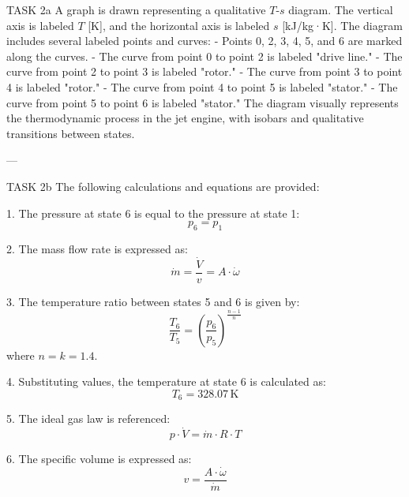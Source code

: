 TASK 2a  
A graph is drawn representing a qualitative \( T \)-\( s \) diagram. The vertical axis is labeled \( T \) [K], and the horizontal axis is labeled \( s \) [kJ/kg·K]. The diagram includes several labeled points and curves:  
- Points 0, 2, 3, 4, 5, and 6 are marked along the curves.  
- The curve from point 0 to point 2 is labeled "drive line."  
- The curve from point 2 to point 3 is labeled "rotor."  
- The curve from point 3 to point 4 is labeled "rotor."  
- The curve from point 4 to point 5 is labeled "stator."  
- The curve from point 5 to point 6 is labeled "stator."  
The diagram visually represents the thermodynamic process in the jet engine, with isobars and qualitative transitions between states.

---

TASK 2b  
The following calculations and equations are provided:  

1. The pressure at state 6 is equal to the pressure at state 1:  
\[
p_6 = p_1
\]

2. The mass flow rate is expressed as:  
\[
\dot{m} = \frac{\dot{V}}{v} = A \cdot \dot{\omega}
\]

3. The temperature ratio between states 5 and 6 is given by:  
\[
\frac{T_6}{T_5} = \left( \frac{p_6}{p_5} \right)^{\frac{n-1}{n}}
\]  
where \( n = k = 1.4 \).  

4. Substituting values, the temperature at state 6 is calculated as:  
\[
T_6 = 328.07 \, \text{K}
\]

5. The ideal gas law is referenced:  
\[
p \cdot \dot{V} = \dot{m} \cdot R \cdot T
\]

6. The specific volume is expressed as:  
\[
v = \frac{A \cdot \dot{\omega}}{\dot{m}}
\]